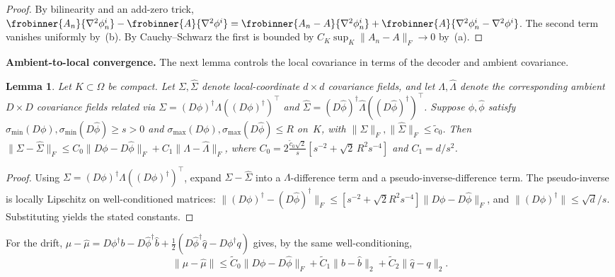 \documentclass[11pt]{article}
\newcommand{\Om}{\Omega}
\newcommand{\norm}[1]{\lVert#1\rVert}
\newcommand{\sigmin}{\sigma_{\min}}
\newcommand{\sigmax}{\sigma_{\max}}
\newtheorem{lem}[thm]{Lemma}
\begin{document}
\begin{proof}
By bilinearity and an add-zero trick,
$\frobinner{A_n}{\nabla^2\phi_n^i}
-\frobinner{A}{\nabla^2\phi^i}
=\frobinner{A_n-A}{\nabla^2\phi_n^i}
+\frobinner{A}{\nabla^2\phi_n^i-\nabla^2\phi^i}$.
The second term vanishes uniformly by~(b).
By Cauchy--Schwarz the first is bounded by
$C_K\sup_K\norm{A_n-A}_F\to 0$ by~(a).
\end{proof}

\noindent\textbf{Ambient-to-local convergence.}
The next lemma controls the local covariance in terms
of the decoder and ambient covariance.

\begin{lem}\label{lem:local-cov-control}
Let $K\subset\Om$ be compact.
Let $\Sigma,\hat\Sigma$ denote local-coordinate
$d\times d$ covariance fields, and let
$\Lambda,\hat\Lambda$ denote the corresponding
ambient $D\times D$ covariance fields related via
$\Sigma=(D\phi)^\dagger\Lambda((D\phi)^\dagger)^\top$
and $\hat\Sigma=(D\hat\phi)^\dagger
\hat\Lambda((D\hat\phi)^\dagger)^\top$.
Suppose $\phi,\hat\phi$ satisfy
$\sigmin(D\phi),\sigmin(D\hat\phi)\ge s>0$ and
$\sigmax(D\phi),\sigmax(D\hat\phi)\le R$ on~$K$,
with $\norm{\Sigma}_F,\norm{\hat\Sigma}_F\le \tilde c_0$.
Then
$\norm{\Sigma-\hat\Sigma}_F
\le C_0\norm{D\phi-D\hat\phi}_F
+ C_1\norm{\Lambda-\hat\Lambda}_F$,
where
$C_0=2\tfrac{\tilde c_0\sqrt{2}}{s}
[s^{-2}+\sqrt{2}\,R^2 s^{-4}]$ and $C_1=d/s^2$.
\end{lem}

\begin{proof}
Using $\Sigma=(D\phi)^\dagger\Lambda((D\phi)^\dagger)^\top$,
expand $\Sigma-\hat\Sigma$ into a $\Lambda$-difference
term and a pseudo-inverse-difference term.
The pseudo-inverse is locally Lipschitz on
well-conditioned matrices:
$\norm{(D\phi)^\dagger-(D\hat\phi)^\dagger}_F
\le[s^{-2}+\sqrt2 R^2 s^{-4}]
\norm{D\phi-D\hat\phi}_F$, and
$\norm{(D\phi)^\dagger}\le\sqrt{d}/s$.
Substituting yields the stated constants.
\end{proof}

For the drift,
$\mu-\hat\mu = D\phi^\dagger b - D\hat\phi^\dagger\hat b
+\tfrac12(D\hat\phi^\dagger\hat q-D\phi^\dagger q)$
gives, by the same well-conditioning,
\begin{equation}\label{eq:drift-control}
  \norm{\mu-\hat\mu}
  \le \tilde C_0\norm{D\phi-D\hat\phi}_F
    + \tilde C_1\norm{b-\hat b}_2
    + \tilde C_2\norm{\hat q-q}_2.
\end{equation}
\end{document}
